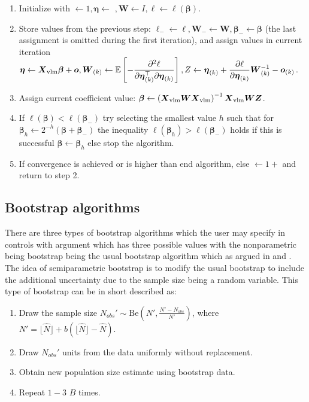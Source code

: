 \documentclass[
]{jss}
\newcommand{\1}{\mathcal{I}} \newcommand{\bZero}{\boldsymbol{0}}
\newcommand{\bbeta}{\boldsymbol{\beta}}
\newcommand{\boeta}{\boldsymbol{\eta}} \newcommand{\bW}{\boldsymbol{W}}
\newcommand{\bo}{\boldsymbol{o}}
\begin{document}
\begin{enumerate}
    \justifying
    \item Initialize with $\leftarrow 1, \boeta\leftarrow$
    $, \bW\leftarrow I, \ell\leftarrow\ell(\bbeta)$.
    \item Store values from the previous step: 
    $\ell_{-}\leftarrow\ell, \bW_{-}\leftarrow\bW, \bbeta_{-}\leftarrow\bbeta$ 
    (the last assignment is omitted during the first iteration), and assign values in current iteration 
    $\displaystyle\boeta\leftarrow\bX_{\text{vlm}}\bbeta+\bo, \bW_{(k)}\leftarrow\mathbb{E}\left[-\frac{\partial^{2}\ell}{\partial\boeta_{(k)}^\top\partial\boeta_{(k)}}\right], Z\leftarrow\boeta_{(k)}+\frac{\partial\ell}{\partial\boeta_{(k)}}\bW_{(k)}^{-1}-\bo_{(k)}$.
    \item Assign current coefficient value: 
    $\bbeta\leftarrow\left(\bX_{\text{vlm}}\bW\bX_{\text{vlm}}\right)^{-1}\bX_{\text{vlm}}\bW\boldsymbol{Z}$.
    \item If $\ell(\bbeta)<\ell(\bbeta_{-})$ try selecting the smallest value $h$ such that for
    $\bbeta_{h}\leftarrow2^{-h}\left(\bbeta+\bbeta_{-}\right)$ the inequality $\ell(\bbeta_{h})>\ell(\bbeta_{-})$ 
    holds if this is successful $\bbeta\leftarrow\bbeta_{h}$ else stop the algorithm.
    \item If convergence is achieved or  is higher than  end algorithm, 
    else $\leftarrow 1+$ and return to step 2.
\end{enumerate}

\subsection{Bootstrap algorithms}\label{bootstrap-algorithms}

There are three types of bootstrap algorithms which the user may specify
in  controls with  argument which has
three possible values
 with the
nonparametric being bootstrap being the usual bootstrap algorithm which
as argued in \cite{norrpoll} and \cite{zwane}. The idea of
semiparametric bootstrap is to modify the usual bootstrap to include the
additional uncertainty due to the sample size being a random variable.
This type of bootstrap can be in short described as:

\begin{enumerate}
    \item Draw the sample size $N_{obs}'\sim\text{Be}\left(N', \frac{N'-N_{obs}}{N'}\right)$, where $N'=\lfloor\hat{N}\rfloor+b\left(\lfloor\hat{N}\rfloor-\hat{N}\right)$.
    \item Draw $N_{obs}'$ units from the data uniformly without replacement.
    \item Obtain new population size estimate using bootstrap data.
    \item Repeat $1-3$ $B$ times.
\end{enumerate}
\end{document}
